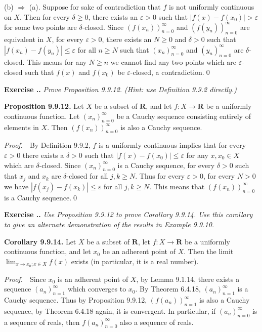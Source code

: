 \documentclass{book}
\newcommand{\pff}{\vspace{.25em}\noindent\emph{Proof.}~~}
\newcommand{\titl}[1]{\noindent\textbf{#1}}
\newcounter{Exercise}[section]
\renewcommand{\theExercise}{\thesection.\arabic{Exercise}.}
\newcommand{\new}{\vspace{1.5em}\noindent\textbf{{Exercise \stepcounter{Exercise}\textbf{\theExercise}}} }
\begin{document}
(b) $\Rightarrow$ (a). Suppose for sake of contradiction that $f$ is not uniformly continuous on $X$. Then for every $\delta\geq 0$, there exists an $\varepsilon>0$ such that $|f(x)-f(x_0)|>\varepsilon$ for some two points are $\delta$-closed. Since $(f(x_n))_{n=0}^{\infty}$ and $(f(y_n))_{n=0}^{\infty}$ are equivalent in $X$, for every $\varepsilon>0$, there exists an $N\geq 0$ and $\delta>0$ such that $|f(x_n)-f(y_n)|\leq\varepsilon$ for all $n\geq N$ such that $(x_n)_{n=0}^{\infty}$ and $(y_n)_{n=0}^{\infty}$ are $\delta$-closed. This means for any $N\geq n$ we cannot find any two points which are $\varepsilon$-closed such that $f(x)$ and $f(x_0)$ be $\varepsilon$-closed, a contradiction.\qed

\new\emph{Prove Proposition 9.9.12. (Hint: use Definition 9.9.2 directly.)}

\begin{framed}
\titl{Proposition 9.9.12.} Let $X$ be a subset of $\mathbf{R}$, and let $f:X\to\mathbf{R}$ be a uniformly continuous function. Let $(x_n)_{n=0}^{\infty}$ be a Cauchy sequence consisting entirely of elements in $X$. Then $(f(x_n))_{n=0}^{\infty}$ is also a Cauchy sequence.
\end{framed}

\pff By Definition 9.9.2, $f$ is a uniformly continuous implies that for every $\varepsilon>0$ there exists a $\delta>0$ such that $|f(x)-f(x_0)|\leq\varepsilon$ for any $x,x_0\in X$ which are $\delta$-closed. Since $(x_n)_{n=0}^{\infty}$ is a Cauchy sequence, for every $\delta>0$ such that $x_j$ and $x_k$ are $\delta$-closed for all $j,k\geq N$. Thus for every $\varepsilon>0$, for every $N>0$ we have $|f(x_j)-f(x_k)|\leq\varepsilon$ for all $j,k\geq N$. This means that $(f(x_n))_{n=0}^{\infty}$ is a Cauchy sequence.\qed

\new\emph{Use Proposition 9.9.12 to prove Corollary 9.9.14. Use this corollary to give an alternate demonstration of the results in Example 9.9.10.}

\begin{framed}
\titl{Corollary 9.9.14.} Let $X$ be a subset of $\mathbf{R}$, let $f:X\to\mathbf{R}$ be a uniformly continuous function, and let $x_0$ be an adherent point of $X$. Then the limit $\lim_{x\to x_0;x\in X}f(x)$ exists (in particular, it is a real number).
\end{framed}

\pff Since $x_0$ is an adherent point of $X$, by Lemma 9.1.14, there exists a sequence $(a_n)_{n=1}^{\infty}$ which converges to $x_0$. By Theorem 6.4.18, $(a_n)_{n=1}^{\infty}$ is a Cauchy sequence. Thus by Proposition 9.9.12, $(f(a_n))_{n=1}^{\infty}$ is also a Cauchy sequence, by Theorem 6.4.18 again, it is convergent. In particular, if $(a_n)_{n=0}^{\infty}$ is a sequence of reals, then $f(a_n)_{n=0}^{\infty}$ also a sequence of reals.
\end{document}
